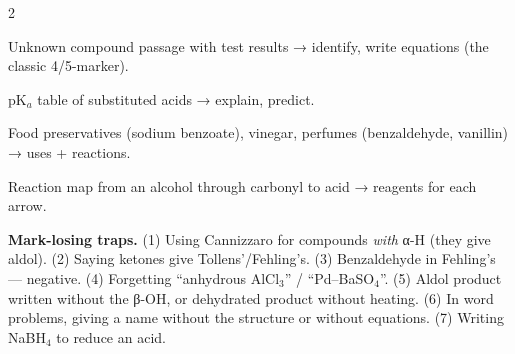 \documentclass[10pt,a4paper]{extarticle}
\begin{document}
\begin{multicols}{2}
\begin{fl}
\item Unknown compound passage with test results → identify, write equations (the classic 4/5-marker).
\item pK$_a$ table of substituted acids → explain, predict.
\item Food preservatives (sodium benzoate), vinegar, perfumes (benzaldehyde, vanillin) → uses + reactions.
\item Reaction map from an alcohol through carbonyl to acid → reagents for each arrow.
\end{fl}

\begin{tip}\Tip \textbf{Mark-losing traps.} (1) Using Cannizzaro for compounds \emph{with} α-H (they give aldol). (2) Saying ketones give Tollens'/Fehling's. (3) Benzaldehyde in Fehling's — negative. (4) Forgetting ``anhydrous AlCl$_3$'' / ``Pd--BaSO$_4$''. (5) Aldol product written without the β-OH, or dehydrated product without heating. (6) In word problems, giving a name without the structure or without equations. (7) Writing NaBH$_4$ to reduce an acid.\end{tip}
\end{multicols}
\begin{tcolorbox}[enhanced,colback=white,colframe=uc,boxrule=0.6pt,arc=2pt,title={\sffamily\bfseries\footnotesize My notes — Ch 8},colbacktitle=uc,coltitle=white,height fill,before skip=4pt]
\end{tcolorbox}
\end{document}
